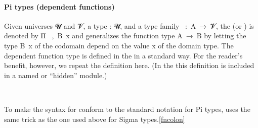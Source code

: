 \paragraph*{Pi types (dependent functions)} %
Given universes \ab 𝓤 and \ab 𝓥, a type  \as : \ab 𝓤\af ̇, and a type family ~\as :~\ab A~\as →~\ab 𝓥\af ̇, the  (or ) is denoted by \ar Π~ ,~\ab B~\ab x and generalizes the function type \ab A~\as →~\ab B by letting the type \ab B~\ab x of the codomain depend on the value \ab x of the domain type. The dependent function type is defined in the \typetopology in a standard way.  For the reader's benefit, however, we repeat the definition here.  (In the \ualib this definition is included in a named or ``hidden'' module.)
\ccpad
\begin{code}%
\>[1]\AgdaSpace{}%
\AgdaSymbol{:}\AgdaSpace{}%
\AgdaSymbol{\{}\AgdaSpace{}%
\AgdaSymbol{:}\AgdaSpace{}%
\AgdaSpace{}%
\AgdaSpace{}%
\AgdaSymbol{\}}\AgdaSpace{}%
\AgdaSymbol{(}\AgdaSpace{}%
\AgdaSymbol{:}\AgdaSpace{}%
\AgdaSpace{}%
\AgdaSpace{}%
\AgdaSpace{}%
\AgdaSpace{}%
\AgdaSymbol{)}\AgdaSpace{}%
\AgdaSpace{}%
\AgdaSpace{}%
\AgdaSpace{}%
\AgdaSpace{}%
\<%
\\
%
\>[1]\AgdaSpace{}%
\AgdaSymbol{\{}\AgdaSymbol{\}}\AgdaSpace{}%
\AgdaSpace{}%
\AgdaSymbol{=}\AgdaSpace{}%
\AgdaSymbol{(}\AgdaSpace{}%
\AgdaSymbol{:}\AgdaSpace{}%
\AgdaSymbol{)}\AgdaSpace{}%
\AgdaSpace{}%
\AgdaSpace{}%
\<%
\end{code}
\ccpad
To make the syntax for  conform to the standard notation for Pi types, \escardo uses the same trick as the one used above for Sigma types.\cref{fncolon}
\ccpad
